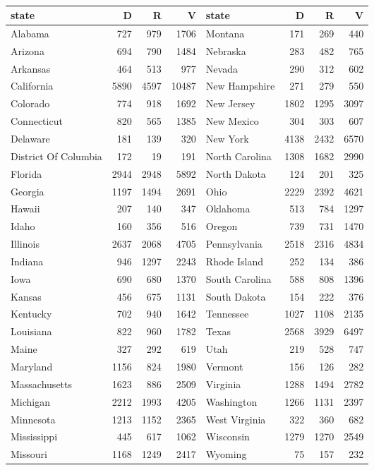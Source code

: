 \begingroup\
\begin{tabular}{lrrrlrrr}
  \hline
state & D & R & V & state & D & R & V \\ 
  \hline
Alabama & 727 & 979 & 1706 & Montana & 171 & 269 & 440 \\ 
  Arizona & 694 & 790 & 1484 & Nebraska & 283 & 482 & 765 \\ 
  Arkansas & 464 & 513 & 977 & Nevada & 290 & 312 & 602 \\ 
  California & 5890 & 4597 & 10487 & New Hampshire & 271 & 279 & 550 \\ 
  Colorado & 774 & 918 & 1692 & New Jersey & 1802 & 1295 & 3097 \\ 
  Connecticut & 820 & 565 & 1385 & New Mexico & 304 & 303 & 607 \\ 
  Delaware & 181 & 139 & 320 & New York & 4138 & 2432 & 6570 \\ 
  District Of Columbia & 172 & 19 & 191 & North Carolina & 1308 & 1682 & 2990 \\ 
  Florida & 2944 & 2948 & 5892 & North Dakota & 124 & 201 & 325 \\ 
  Georgia & 1197 & 1494 & 2691 & Ohio & 2229 & 2392 & 4621 \\ 
  Hawaii & 207 & 140 & 347 & Oklahoma & 513 & 784 & 1297 \\ 
  Idaho & 160 & 356 & 516 & Oregon & 739 & 731 & 1470 \\ 
  Illinois & 2637 & 2068 & 4705 & Pennsylvania & 2518 & 2316 & 4834 \\ 
  Indiana & 946 & 1297 & 2243 & Rhode Island & 252 & 134 & 386 \\ 
  Iowa & 690 & 680 & 1370 & South Carolina & 588 & 808 & 1396 \\ 
  Kansas & 456 & 675 & 1131 & South Dakota & 154 & 222 & 376 \\ 
  Kentucky & 702 & 940 & 1642 & Tennessee & 1027 & 1108 & 2135 \\ 
  Louisiana & 822 & 960 & 1782 & Texas & 2568 & 3929 & 6497 \\ 
  Maine & 327 & 292 & 619 & Utah & 219 & 528 & 747 \\ 
  Maryland & 1156 & 824 & 1980 & Vermont & 156 & 126 & 282 \\ 
  Massachusetts & 1623 & 886 & 2509 & Virginia & 1288 & 1494 & 2782 \\ 
  Michigan & 2212 & 1993 & 4205 & Washington & 1266 & 1131 & 2397 \\ 
  Minnesota & 1213 & 1152 & 2365 & West Virginia & 322 & 360 & 682 \\ 
  Mississippi & 445 & 617 & 1062 & Wisconsin & 1279 & 1270 & 2549 \\ 
  Missouri & 1168 & 1249 & 2417 & Wyoming & 75 & 157 & 232 \\ 
   \hline
\end{tabular}
\endgroup

